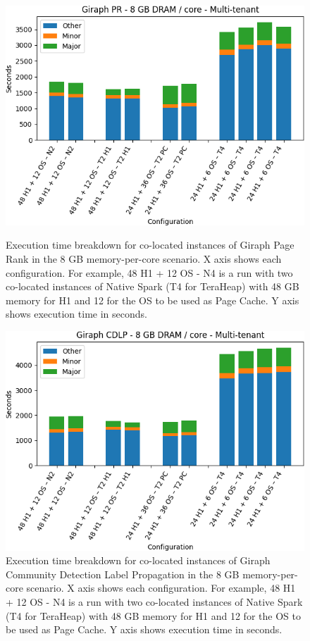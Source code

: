 \begin{figure}[thbp]
        \centering
    \includegraphics[width=\linewidth]{./fig/g_pr128.png}
    \caption{Execution time breakdown for co-located instances of Giraph
    Page Rank in the 8 GB memory-per-core scenario. X axis shows each configuration.
        For example, 48 H1 + 12 OS - N4 is a run with two co-located instances of Native Spark (T4 for TeraHeap) with 48 GB memory for H1 and 12 for the OS to be used as Page Cache. Y axis shows execution time in seconds.}
    \label{fig:g_pr128}
    \includegraphics[width=\linewidth]{./fig/g_cdlp128.png}
    \caption{Execution time breakdown for co-located instances of Giraph
    Community Detection Label Propagation in the 8 GB memory-per-core scenario. X axis shows each configuration.
        For example, 48 H1 + 12 OS - N4 is a run with two co-located instances of Native Spark (T4 for TeraHeap) with 48 GB memory for H1 and 12 for the OS to be used as Page Cache. Y axis shows execution time in seconds.}
    \label{fig:g_cdlp128}
\end{figure}


